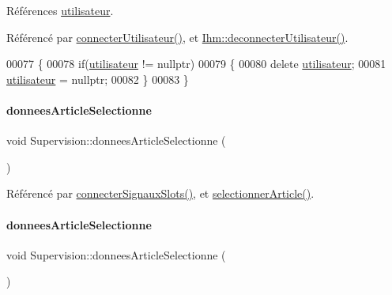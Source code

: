Références \hyperlink{_supervision_8h_source_l00082}{utilisateur}.



Référencé par \hyperlink{_supervision_8cpp_source_l00256}{connecter\+Utilisateur()}, et \hyperlink{_ihm_8cpp_source_l00159}{Ihm\+::deconnecter\+Utilisateur()}.


\begin{DoxyCode}
00077 \{
00078     \textcolor{keywordflow}{if}(\hyperlink{class_supervision_a92384f2b12b2549cee988f83add8ad49}{utilisateur} != \textcolor{keyword}{nullptr})
00079     \{
00080         \textcolor{keyword}{delete} \hyperlink{class_supervision_a92384f2b12b2549cee988f83add8ad49}{utilisateur};
00081         \hyperlink{class_supervision_a92384f2b12b2549cee988f83add8ad49}{utilisateur} = \textcolor{keyword}{nullptr};
00082     \}
00083 \}
\end{DoxyCode}
\mbox{\label{class_supervision_ae486eafc331964e223c35ae2b54fa669}} 
\paragraph{\texorpdfstring{donnees\+Article\+Selectionne}{donneesArticleSelectionne}\hspace{0.1cm}{\footnotesize\ttfamily [1/2]}}
{\footnotesize\ttfamily void Supervision\+::donnees\+Article\+Selectionne (\begin{DoxyParamCaption}\item[{Q\+Vector$<$ Q\+String\+List $>$}]{ }\end{DoxyParamCaption})\hspace{0.3cm}{\ttfamily [signal]}}



Référencé par \hyperlink{_supervision_8cpp_source_l00273}{connecter\+Signaux\+Slots()}, et \hyperlink{_supervision_8cpp_source_l00320}{selectionner\+Article()}.

\mbox{\label{class_supervision_ae01e53be90edf2656432c5da56331b9d}} 
\paragraph{\texorpdfstring{donnees\+Article\+Selectionne}{donneesArticleSelectionne}\hspace{0.1cm}{\footnotesize\ttfamily [2/2]}}
{\footnotesize\ttfamily void Supervision\+::donnees\+Article\+Selectionne (\begin{DoxyParamCaption}\item[{Q\+String\+List}]{ }\end{DoxyParamCaption})\hspace{0.3cm}{\ttfamily [signal]}}

